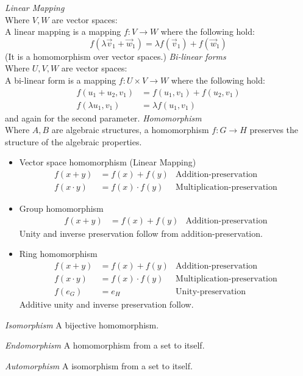 \documentclass[8pt,landscape]{article}
\begin{document}
\begin{multicols}{3}
    \emph{Linear Mapping} \\
    Where $V, W$ are vector spaces: \\
    A linear mapping is a mapping $f : V \to W$ where the following hold:
    \[
        f(\lambda \vec{v}_1 + \vec{w}_1) = \lambda  f(\vec{v}_1) + f(\vec{w}_1)
    \]
    (It is a homomorphism over vector spaces.)
    \emph{Bi-linear forms} \\
    Where $U, V, W$ are vector spaces: \\
    A bi-linear form is a mapping $f : U \times V \to W$ where the following hold:
    \begin{align*}
        f(u_1 + u_2, v_1)   & = f(u_1, v_1) + f(u_2, v_1) \\
        f(\lambda u_1, v_1) & = \lambda f(u_1, v_1)
    \end{align*}
    and again for the second parameter.
    \emph{Homomorphism} \\
    Where $A, B$ are algebraic structures,
    a homomorphism $f : G \to H$ preserves the structure of the algebraic properties.

    \begin{itemize}
        \item Vector space homomorphism (Linear Mapping)
            \begin{align*}
                f(x + y) &= f(x) + f(y) &\text{Addition-preservation} \\
                f(x \cdot y) &= f(x) \cdot f(y) &\text{Multiplication-preservation}
            \end{align*}

        \item Group homomorphism
            \begin{align*}
                f(x + y) &= f(x) + f(y) & \text{Addition-preservation}
            \end{align*}
            Unity and inverse preservation follow from addition-preservation.

        \item Ring homomorphism
            \begin{align*}
                f(x + y) &= f(x) + f(y) & \text{Addition-preservation} \\
                f(x \cdot y) &= f(x) \cdot f(y) & \text{Multiplication-preservation} \\
                f(e_G) &= e_H & \text{Unity-preservation}
            \end{align*}
            Additive unity and inverse preservation follow.
    \end{itemize}

    \emph{Isomorphism}
    A bijective homomorphism.

    \emph{Endomorphism}
    A homomorphism from a set to itself.

    \emph{Automorphism}
    A isomorphism from a set to itself.

\end{multicols}
\end{document}
